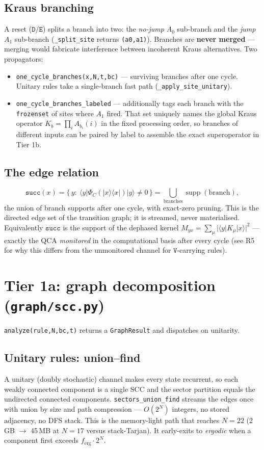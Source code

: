 \documentclass[11pt]{article}
\newcommand{\rt}[1]{\texttt{#1}}
\newcommand{\pf}[1]{\texttt{#1}}          %
\newcommand{\fn}[1]{\texttt{#1}}          %
\providecommand{\ket}[1]{|#1\rangle}
\providecommand{\bra}[1]{\langle #1|}
\begin{document}
\subsection{Kraus branching}
A reset ($\rt D$/$\rt E$) splits a branch into two: the \emph{no-jump} $A_0$
sub-branch and the \emph{jump} $A_1$ sub-branch (\fn{\_split\_site} returns
\fn{(a0,a1)}). Branches are \textbf{never merged} --- merging would fabricate
interference between incoherent Kraus alternatives. Two propagators:
\begin{itemize}
\item \fn{one\_cycle\_branches(x,N,t,bc)} --- surviving branches after one cycle.
  Unitary rules take a single-branch fast path (\fn{\_apply\_site\_unitary}).
\item \fn{one\_cycle\_branches\_labeled} --- additionally tags each branch with
  the \fn{frozenset} of sites where $A_1$ fired. That set uniquely names the
  global Kraus operator $K_b=\prod_i A_{b_i}(i)$ in the fixed processing order,
  so branches of different inputs can be paired by label to assemble the exact
  superoperator in Tier 1b.
\end{itemize}

\subsection{The edge relation}
\begin{equation}
\fn{succ}(x)=\{\,y:\ \bra{y}\Phi_C(\ket{x}\!\bra{x})\ket{y}\neq0\,\}
          =\bigcup_{\text{branches}}\operatorname{supp}(\text{branch}),
\label{eq:succ}
\end{equation}
the union of branch supports after one cycle, with exact-zero pruning. This is
the directed edge set of the transition graph; it is streamed, never
materialised. Equivalently $\fn{succ}$ is the support of the dephased kernel
$M_{yx}=\sum_\mu|\bra{y}K_\mu\ket{x}|^2$ --- exactly the QCA \emph{monitored} in
the computational basis after every cycle (see R5 for why this differs from the
unmonitored channel for $\rt V$-carrying rules).

\section{Tier 1a: graph decomposition (\pf{graph/scc.py})}
\label{sec:graph}
\fn{analyze(rule,N,bc,t)} returns a \fn{GraphResult} and dispatches on
unitarity.

\subsection{Unitary rules: union--find}
A unitary (doubly stochastic) channel makes every state recurrent, so each
weakly connected component is a single SCC and the sector partition equals the
undirected connected components. \fn{sectors\_union\_find} streams the edges once
with union by size and path compression --- $O(2^N)$ integers, no stored
adjacency, no DFS stack. This is the memory-light path that reaches $N=22$
(2\,GB $\to$ 45\,MB at $N=17$ versus stack-Tarjan). It early-exits to
\emph{ergodic} when a component first exceeds $f_{\text{erg}}\cdot2^N$.
\end{document}
